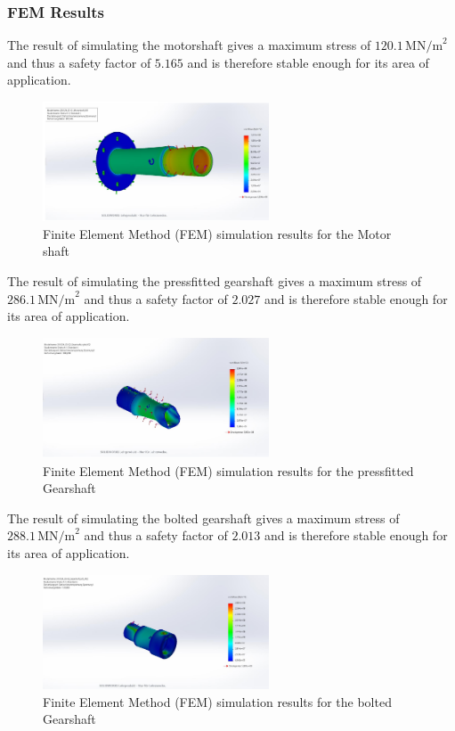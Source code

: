 \subsubsection{FEM Results}
The result of simulating the motorshaft gives a maximum stress of \(120.1 \, \text{MN/m}^2\) and thus a safety factor of \(5.165\) and is therefore stable enough for its area of application.

\begin{figure}[H]
\centering
\includegraphics[width=0.6\textwidth]{texfiles/mech/eimg/propulsion/picture_simulation_motorshaft}
\caption{Finite Element Method (FEM) simulation results for the Motor shaft}
\label{fig:motorshaft_simulation}
\end{figure}

The result of simulating the pressfitted gearshaft gives a maximum stress of \(286.1 \, \text{MN/m}^2\) and thus a safety factor of \(2.027\) and is therefore stable enough for its area of application.

\begin{figure}[H]
\centering
\includegraphics[width=0.6\textwidth]{texfiles/mech/eimg/propulsion/picture_simulation_gearshaft_right}
\caption{Finite Element Method (FEM) simulation results for the pressfitted Gearshaft}
\label{fig:gearshaft_simulation}
\end{figure}

The result of simulating the bolted gearshaft gives a maximum stress of \(288.1 \, \text{MN/m}^2\) and thus a safety factor of \(2.013\) and is therefore stable enough for its area of application.

\begin{figure}[H]
\centering
\includegraphics[width=0.6\textwidth]{texfiles/mech/eimg/propulsion/picture_simulation_gearshaft_left}
\caption{Finite Element Method (FEM) simulation results for the bolted Gearshaft}
\label{fig:gearshaft_simulation}
\end{figure}

